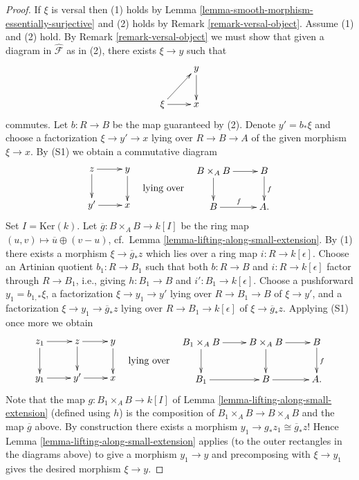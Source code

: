 \begin{proof}
If $\xi$ is versal then (1) holds by
Lemma \ref{lemma-smooth-morphism-essentially-surjective}
and (2) holds by
Remark \ref{remark-versal-object}.
Assume (1) and (2) hold. By
Remark \ref{remark-versal-object}
we must show that given a diagram in $\widehat{\mathcal{F}}$ as in (2),
there exists $\xi \to y$ such that
$$
\xymatrix{
            &  y \ar[d] \\
\xi \ar[ur] \ar[r]  &  x
}
$$
commutes. Let $b : R \to B$ be the map guaranteed by (2). Denote
$y' = b_*\xi$ and choose a factorization $\xi \to y' \to x$
lying over $R \to B \to A$ of the given morphism $\xi \to x$.
By (S1) we obtain a commutative diagram
$$
\vcenter{
\xymatrix{
z  \ar[r] \ar[d]          &  y \ar[d] \\
y' \ar[r]  &  x
}
}
\quad\text{lying over}\quad
\vcenter{
\xymatrix{
B \times_{A} B \ar[d] \ar[r] &   B  \ar[d]^{f} \\
B \ar[r]^{f} &   A .
}
}
$$
Set $I = \text{Ker}(k)$. Let $\overline{g} : B \times_A B \to k[I]$
be the ring map $(u, v) \mapsto \overline{u} \oplus (v - u)$,
cf.\ Lemma \ref{lemma-lifting-along-small-extension}.
By (1) there exists a morphism $\xi \to \overline{g}_*z$ which lies over a ring
map $i : R \to k[\epsilon]$. Choose an Artinian quotient
$b_1 : R \to B_1$ such that both $b : R \to B$ and $i : R \to k[\epsilon]$
factor through $R \to B_1$, i.e., giving
$h : B_1 \to B$ and $i' : B_1 \to k[\epsilon]$.
Choose a pushforward $y_1 = b_{1, *}\xi$, a factorization
$\xi \to y_1 \to y'$ lying over $R \to B_1 \to B$ of $\xi \to y'$, and a
factorization $\xi \to y_1 \to \overline{g}_*z$ lying over
$R \to B_1 \to k[\epsilon]$ of $\xi \to \overline{g}_*z$.
Applying (S1) once more we obtain
$$
\vcenter{
\xymatrix{
z_1  \ar[r] \ar[d] & z \ar[r] \ar[d] & y \ar[d] \\
y_1 \ar[r] & y' \ar[r] &  x
}
}
\quad\text{lying over}\quad
\vcenter{
\xymatrix{
B_1 \times_A B \ar[d] \ar[r] & B \times_A B \ar[r] \ar[d] & B \ar[d]^{f} \\
B_1 \ar[r]  & B \ar[r] &  A .
}
}
$$
Note that the map $g : B_1 \times_A B \to k[I]$ of
Lemma \ref{lemma-lifting-along-small-extension}
(defined using $h$)
is the composition of $B_1 \times_A B \to B \times_A B$ and the map
$\overline{g}$ above. By construction there exists a morphism
$y_1 \to g_*z_1 \cong \overline{g}_*z$! Hence
Lemma \ref{lemma-lifting-along-small-extension}
applies (to the outer rectangles in the diagrams above)
to give a morphism $y_1 \to y$ and precomposing
with $\xi \to y_1$ gives the desired morphism $\xi \to y$. 
\end{proof}

